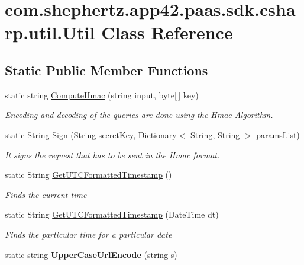 \hypertarget{classcom_1_1shephertz_1_1app42_1_1paas_1_1sdk_1_1csharp_1_1util_1_1_util}{\section{com.\+shephertz.\+app42.\+paas.\+sdk.\+csharp.\+util.\+Util Class Reference}
\label{classcom_1_1shephertz_1_1app42_1_1paas_1_1sdk_1_1csharp_1_1util_1_1_util}
}
\subsection*{Static Public Member Functions}
\begin{DoxyCompactItemize}
\item 
static string \hyperlink{classcom_1_1shephertz_1_1app42_1_1paas_1_1sdk_1_1csharp_1_1util_1_1_util_aa8276e9328e83dc28163392615c8e25f}{Compute\+Hmac} (string input, byte\mbox{[}$\,$\mbox{]} key)
\begin{DoxyCompactList}\small\item\em Encoding and decoding of the queries are done using the Hmac Algorithm. \end{DoxyCompactList}\item 
static String \hyperlink{classcom_1_1shephertz_1_1app42_1_1paas_1_1sdk_1_1csharp_1_1util_1_1_util_ae131ccc6c77e96007fef9e9db2511224}{Sign} (String secret\+Key, Dictionary$<$ String, String $>$ params\+List)
\begin{DoxyCompactList}\small\item\em It signs the request that has to be sent in the Hmac format. \end{DoxyCompactList}\item 
static String \hyperlink{classcom_1_1shephertz_1_1app42_1_1paas_1_1sdk_1_1csharp_1_1util_1_1_util_a37cb1b8c121d7dbc5d684073a70bd837}{Get\+U\+T\+C\+Formatted\+Timestamp} ()
\begin{DoxyCompactList}\small\item\em Finds the current time \end{DoxyCompactList}\item 
static String \hyperlink{classcom_1_1shephertz_1_1app42_1_1paas_1_1sdk_1_1csharp_1_1util_1_1_util_a0f6ab0e8c8f4130629102e7355701696}{Get\+U\+T\+C\+Formatted\+Timestamp} (Date\+Time dt)
\begin{DoxyCompactList}\small\item\em Finds the particular time for a particular date \end{DoxyCompactList}\item 
\hypertarget{classcom_1_1shephertz_1_1app42_1_1paas_1_1sdk_1_1csharp_1_1util_1_1_util_a4ae19c2396d5ca66ac75c283d3ee1253}{static string {\bfseries Upper\+Case\+Url\+Encode} (string s)}\label{classcom_1_1shephertz_1_1app42_1_1paas_1_1sdk_1_1csharp_1_1util_1_1_util_a4ae19c2396d5ca66ac75c283d3ee1253}


\end{DoxyCompactItemize}
